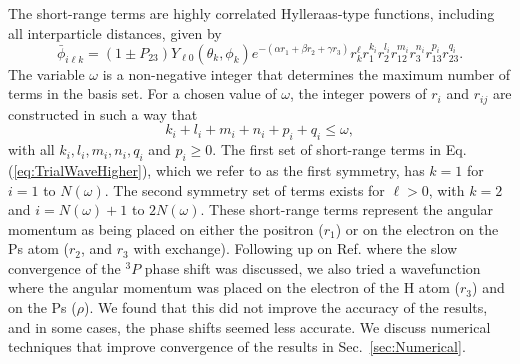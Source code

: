 \documentclass[preprint,showpacs,showkeys,preprintnumbers,amsmath,amssymb,longbibliography,pra,aps]{revtex4-1}
\newcommand{\todoi}{\todo[inline]}
\begin{document}
The short-range terms are highly correlated Hylleraas-type functions, including
all interparticle distances, given by
\begin{equation}
\label{eq:PhiDef}
\bar{\phi}_{i\ell k} = \left(1 \pm P_{23}\right) Y_{\ell 0}(\theta_k,\phi_k)
e^{-(\alpha r_1 + \beta r_2 + \gamma r_3)}
r_k^{\ell} r_1^{k_i} r_2^{l_i} r_{12}^{m_i} r_3^{n_i} r_{13}^{p_i} r_{23}^{q_i}.
\end{equation}
The variable $\omega$ is a non-negative integer that determines the maximum
number of terms in the basis set. For a chosen value of $\omega$, the integer
powers of $r_i$ and $r_{ij}$ are constructed in such a way that 
\begin{equation}
k_i + l_i + m_i + n_i + p_i + q_i \leq \omega,
\end{equation}
with all $k_i, l_i, m_i, n_i, q_i$ and $p_i \geq 0$.
The first set of short-range terms in Eq. (\ref{eq:TrialWaveHigher}), which we
refer to as the first symmetry, has $k=1$ for $i=1$ to $N(\omega)$. The second
symmetry set of terms exists for $\ell > 0$, with $k=2$ and $i = N(\omega)+1$
to $2N(\omega)$. These short-range terms represent the angular momentum as being placed on 
either the positron ($r_1$) or on the electron on the Ps atom ($r_2$, and $r_3$
with exchange). Following up on Ref. \cite{VanReeth2004} where the slow 
convergence of the $^3P$ phase shift was discussed, we also tried a 
wavefunction where the angular momentum was placed on the electron of the H 
atom ($r_3$) and on the Ps ($\rho$). We found that this did not improve the
accuracy of the results, and in some cases, the phase shifts seemed less
accurate. We discuss numerical techniques that improve convergence of the
results in Sec.~\ref{sec:Numerical}.

\end{document}
